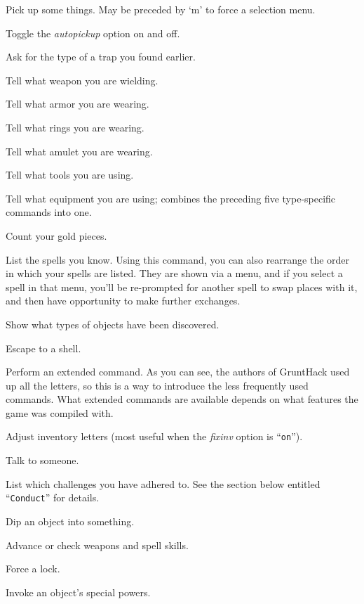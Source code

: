 \item[\tb{,}]
Pick up some things. May be preceded by `m' to force a selection menu.
\item[\tb{@}]
Toggle the
{\it autopickup }
option on and off.
\item[\tb{\^}]
Ask for the type of a trap you found earlier.
\item[\tb{)}]
Tell what weapon you are wielding.
\item[\tb{[}]
Tell what armor you are wearing.
\item[\tb{=}]
Tell what rings you are wearing.
\item[\tb{"}]
Tell what amulet you are wearing.
\item[\tb{(}]
Tell what tools you are using.
\item[\tb{*}]
Tell what equipment you are using; combines the preceding five type-specific
commands into one.
\item[\tb{\$}]
Count your gold pieces.
\item[\tb{+}]
List the spells you know.  Using this command, you can also rearrange
the order in which your spells are listed.  They are shown via a menu,
and if you select a spell in that menu, you'll be re-prompted for
another spell to swap places with it, and then have opportunity to
make further exchanges.
\item[\tb{$\backslash$}]
Show what types of objects have been discovered.
\item[\tb{!}]
Escape to a shell.
\item[\tb{\#}]
Perform an extended command.  As you can see, the authors of GruntHack
used up all the letters, so this is a way to introduce the less frequently
used commands.
What extended commands are available depends on what features the game was
compiled with.
\item[\tb{\#adjust}]
Adjust inventory letters (most useful when the
{\it fixinv }
option is ``{\tt on}'').
\item[\tb{\#chat}]
Talk to someone.
\item[\tb{\#conduct}]
List which challenges you have adhered to.  See the section below entitled
``{\tt Conduct}'' for details.
\item[\tb{\#dip}]
Dip an object into something.
\item[\tb{\#enhance}]
Advance or check weapons and spell skills.
\item[\tb{\#force}]
Force a lock.
\item[\tb{\#invoke}]
Invoke an object's special powers.
\item[\tb{\#jump}]
